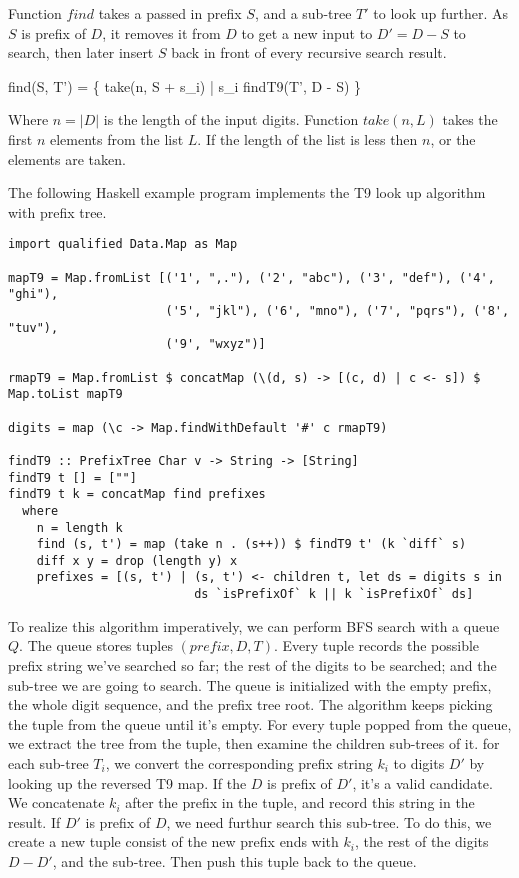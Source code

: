 \documentclass{article}
\begin{document}
Function $find$ takes a passed in prefix $S$, and a sub-tree $T'$ to look up further. As $S$ is prefix of $D$, it removes it from $D$ to get a new input to $D' = D - S$ to search, then later insert $S$ back in front of every recursive search result.

\be
find(S, T') = \{ take(n, S + s_i) | s_i \in findT9(T', D - S) \}
\ee

Where $n = |D|$ is the length of the input digits. Function $take(n, L)$ takes the first $n$ elements from the list $L$. If the length of the list is less then $n$, or the elements are taken.

The following Haskell example program implements the T9 look up algorithm with prefix tree.

\lstset{language=Haskell}
\begin{lstlisting}
import qualified Data.Map as Map

mapT9 = Map.fromList [('1', ",."), ('2', "abc"), ('3', "def"), ('4', "ghi"),
                      ('5', "jkl"), ('6', "mno"), ('7', "pqrs"), ('8', "tuv"),
                      ('9', "wxyz")]

rmapT9 = Map.fromList $ concatMap (\(d, s) -> [(c, d) | c <- s]) $ Map.toList mapT9

digits = map (\c -> Map.findWithDefault '#' c rmapT9)

findT9 :: PrefixTree Char v -> String -> [String]
findT9 t [] = [""]
findT9 t k = concatMap find prefixes
  where
    n = length k
    find (s, t') = map (take n . (s++)) $ findT9 t' (k `diff` s)
    diff x y = drop (length y) x
    prefixes = [(s, t') | (s, t') <- children t, let ds = digits s in
                          ds `isPrefixOf` k || k `isPrefixOf` ds]
\end{lstlisting}

To realize this algorithm imperatively, we can perform BFS search with a queue $Q$.
The queue stores tuples $(prefix, D, T)$. Every tuple records the possible
prefix string we've searched so far; the rest of the digits to be searched;
and the sub-tree we are going to search. The queue is initialized with the
empty prefix, the whole digit sequence, and the prefix tree root. The algorithm
keeps picking the tuple from the queue until it's empty. For every tuple
popped from the queue, we extract the tree from the tuple, then examine the
children sub-trees of it. for each sub-tree $T_i$, we convert the corresponding
prefix string $k_i$ to digits $D'$ by looking up the reversed T9 map. If the
$D$ is prefix of $D'$, it's a valid candidate. We concatenate $k_i$ after
the prefix in the tuple, and record this string in the result. If $D'$ is
prefix of $D$, we need furthur search this sub-tree. To do this, we
create a new tuple consist of the new prefix ends with $k_i$, the rest of
the digits $D-D'$, and the sub-tree. Then push this tuple back to the queue.
\end{document}
